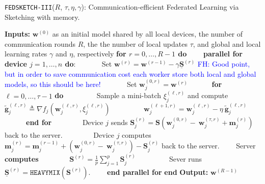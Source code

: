 \begin{algorithm}[H]
\caption{\texttt{FEDSKETCH-III}($R$, $\tau, \eta, \gamma$): Communication-efficient Federated Learning via Sketching with memory. }\label{Alg:ce-h-wm}
\begin{algorithmic}[1]
\State \textbf{Inputs:} $\boldsymbol{w}^{(0)}$ as an initial  model shared by all local devices, the number of communication rounds $R$, the the number of local updates $\tau$, and global and local learning rates $\gamma$ and $\eta$, respectively
\State \textbf{for $r=0, \ldots, R-1$ do}
\State $\qquad$\textbf{parallel for device $j=1,\ldots,n$ do}:
\State $\qquad\quad$ Set $\boldsymbol{w}^{(r)}=\boldsymbol{w}^{(r-1)}-\gamma\underline{\mathbf{S}}^{(r)}$  \textcolor{blue}{FH: Good point, but in order to save communication cost each worker store both local and global models, so this should be here!}
\State $\qquad\quad$ Set $\boldsymbol{w}_j^{(0,r)}=\boldsymbol{w}^{(r)}$ 
\State $\qquad\quad $\textbf{for} $\ell=0,\ldots,\tau-1$ \textbf{do}
\State $\qquad\quad\quad$ Sample a mini-batch $\xi_j^{(\ell,r)}$ and compute $\tilde{\mathbf{g}}_{j}^{(\ell,r)}\triangleq\nabla{f}_j(\boldsymbol{w}^{(\ell,r)}_j,\xi_j^{(\ell,r)})$
\State $\qquad\quad\quad$ $\boldsymbol{w}^{(\ell+1,r)}_{j}=\boldsymbol{w}^{(\ell,r)}_j-\eta~ \tilde{\mathbf{g}}_{j}^{(\ell,r)}$ \label{eq:update-rule-alg}
\State $\qquad\quad$\textbf{end for}
\State $\qquad\quad\quad$Device $j$ sends $\mathbf{S}_j^{(r)}=\mathbf{S}\left(\boldsymbol{w}_j^{(0,r)}-~{\boldsymbol{w}}_{j}^{(\tau,r)}+\mathbf{m}_j^{(r)}\right)$ back to the server.
\State $\qquad\quad\quad$Device $j$ computes $\mathbf{m}_j^{(r)}=\mathbf{m}_j^{(r-1)}+\left(\boldsymbol{w}_j^{(0,r)}-~{\boldsymbol{w}}_{j}^{(\tau,r)}\right)-\mathbf{S}_j^{(r)}$ back to the server.
\State $\qquad$Server \textbf{computes} 
\State $\qquad\qquad {\mathbf{S}}^{(r)}=\frac{1}{p}\sum_{j=1}^p\mathbf{S}^{(r)}_j$ %
\State $\qquad\qquad$ Sever runs $\underline{\mathbf{S}}^{(r)}= \texttt{HEAVYMIX}(\mathbf{S}^{(r)})$.
\State $\qquad$\textbf{end parallel for}
\State \textbf{end}
\State \textbf{Output:} ${\boldsymbol{w}}^{(R-1)}$
\vspace{- 0.1cm}
\end{algorithmic}
\end{algorithm}


